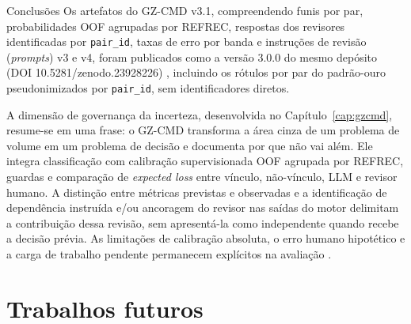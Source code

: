 \begin{chapter}{Conclusões}
Os artefatos do GZ-CMD v3.1, compreendendo funis por par, probabilidades OOF agrupadas por REFREC, respostas dos revisores identificadas por \texttt{pair\_id}, taxas de erro por banda e instruções de revisão (\textit{prompts}) v3 e v4, foram publicados como a versão 3.0.0 do mesmo depósito (DOI 10.5281/zenodo.23928226) \cite{Jardim2026zenodoGzcmd}, incluindo os rótulos por par do padrão-ouro pseudonimizados por \texttt{pair\_id}, sem identificadores diretos.

A dimensão de governança da incerteza, desenvolvida no Capítulo~\ref{cap:gzcmd}, resume-se em uma frase: o GZ-CMD transforma a área cinza de um problema de volume em um problema de decisão e documenta por que não vai além. Ele integra classificação com calibração supervisionada OOF agrupada por REFREC, guardas e comparação de \textit{expected loss} entre vínculo, não-vínculo, LLM e revisor humano. A distinção entre métricas previstas e observadas e a identificação de dependência instruída e/ou ancoragem do revisor nas saídas do motor delimitam a contribuição dessa revisão, sem apresentá-la como independente quando recebe a decisão prévia. As limitações de calibração absoluta, o erro humano hipotético e a carga de trabalho pendente permanecem explícitos na avaliação \cite{Jardim2026phdrepo}.

\section{Trabalhos futuros}
\label{sec:cap7-trabalhos-futuros}


\end{chapter}
